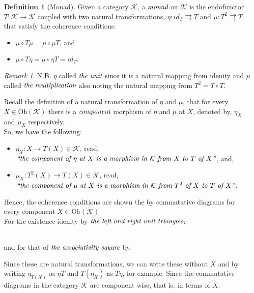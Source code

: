 \documentclass[10pt, oneside, reqno]{amsart}
\theoremstyle{plain}%
\theoremstyle{definition}
\newtheorem{defn}[thm]{Definition}
\theoremstyle{remark}
\newtheorem*{rem}{Remark}
\newcommand{\Id}{\mathit{id}_}
\begin{document}
\begin{defn}[Monad]
 Given a category $\mathcal{K}$, a $\emph{monad}$ on $\mathcal{K}$ is the endofunctor $T: \mathcal{K} \to \mathcal{K}$
 coupled with two natural transformations, $\eta: \Id{\mathcal{C}} \rightrightarrows T$ and $\mu: T^2 \rightrightarrows T$
 that satisfy the coherence conditions:
 \begin{itemize}
  \item $\mu \circ T \mu = \mu \circ \mu T$, and
  \item $\mu \circ T \eta = \mu \circ \eta T = \Id{T}$.
 \end{itemize}
\end{defn}
\begin{rem}
 N.B. $\eta$ called $\emph{the unit}$ since it is a natural mapping from idenity and
 $\mu$ called $\emph{the multiplication}$ also noting the natural mapping from $T^2 = T \circ T$.
\end{rem}

Recall the definition of a natural transformation of $\eta$ and $\mu$, that for every $X \in \text{Ob}(\mathcal{K})$
there is a $\emph{component}$ morphism of $\eta$ and $\mu$ at $X$, denoted by, $\eta_{X}$ and $\mu_{X}$ respectively.
\\
So, we have the following:
\begin{itemize}
 \item $\eta_{X}: X \to T(X) \in \mathcal{K}$,
 read, $\emph{``the component of $\eta$ at $X$ is a morphism in $\mathcal{K}$ from $X$ to $T$ of $X$''}$, and,
 \item $\mu_{X}: T^2(X) \to T(X) \in \mathcal{K}$,
 read, $\emph{``the component of $\mu$ at $X$ is a morphism in $\mathcal{K}$ from $T^2$ of $X$ to $T$ of $X$''}$.
\end{itemize}

Hence, the coherence conditions are shown the by commutative diagrams for every component $X \in \text{Ob}(\mathcal{K})$
\\
For the existence idenity by $\emph{the left and right unit triangles}$:
\\
and for that of $\emph{the associativity square}$ by:
Since these are natural transformations,
we can write these without $X$ and by writing $\eta_{T(X)}$ as $\eta T$ and $T(\eta_{X})$ as $T \eta$, for example.
Since the commutative diagrams in the category $\mathcal{K}$ are component wise, that is, in terms of $X$.
\end{document}
